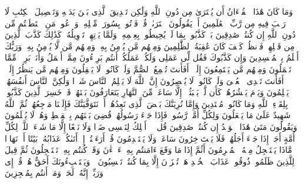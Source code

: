 \startbuffer[\q:10:37]
وَمَا كَانَ هَٰذَا ٱلۡقُرۡءَانُ أَن یُفۡتَرَىٰ مِن دُونِ ٱللَّهِ وَلَٰكِن تَصۡدِیقَ ٱلَّذِی بَیۡنَ یَدَیۡهِ وَتَفۡصِیلَ ٱلۡكِتَٰبِ لَا رَیۡبَ فِیهِ مِن رَّبِّ ٱلۡعَٰلَمِینَ%
\stopbuffer%
\startbuffer[\q:10:38]
أَمۡ یَقُولُونَ ٱفۡتَرَىٰهُۖ قُلۡ فَأۡتُوا۟ بِسُورَةࣲ مِّثۡلِهِۦ وَٱدۡعُوا۟ مَنِ ٱسۡتَطَعۡتُم مِّن دُونِ ٱللَّهِ إِن كُنتُمۡ صَٰدِقِینَ%
\stopbuffer%
\startbuffer[\q:10:39]
بَلۡ كَذَّبُوا۟ بِمَا لَمۡ یُحِیطُوا۟ بِعِلۡمِهِۦ وَلَمَّا یَأۡتِهِمۡ تَأۡوِیلُهُۥۚ كَذَٰلِكَ كَذَّبَ ٱلَّذِینَ مِن قَبۡلِهِمۡۖ فَٱنظُرۡ كَیۡفَ كَانَ عَٰقِبَةُ ٱلظَّٰلِمِینَ%
\stopbuffer%
\startbuffer[\q:10:40]
وَمِنۡهُم مَّن یُؤۡمِنُ بِهِۦ وَمِنۡهُم مَّن لَّا یُؤۡمِنُ بِهِۦۚ وَرَبُّكَ أَعۡلَمُ بِٱلۡمُفۡسِدِینَ%
\stopbuffer%
\startbuffer[\q:10:41]
وَإِن كَذَّبُوكَ فَقُل لِّی عَمَلِی وَلَكُمۡ عَمَلُكُمۡۖ أَنتُم بَرِیۤءُونَ مِمَّاۤ أَعۡمَلُ وَأَنَا۠ بَرِیۤءࣱ مِّمَّا تَعۡمَلُونَ%
\stopbuffer%
\startbuffer[\q:10:42]
وَمِنۡهُم مَّن یَسۡتَمِعُونَ إِلَیۡكَۚ أَفَأَنتَ تُسۡمِعُ ٱلصُّمَّ وَلَوۡ كَانُوا۟ لَا یَعۡقِلُونَ%
\stopbuffer%
\startbuffer[\q:10:43]
وَمِنۡهُم مَّن یَنظُرُ إِلَیۡكَۚ أَفَأَنتَ تَهۡدِی ٱلۡعُمۡیَ وَلَوۡ كَانُوا۟ لَا یُبۡصِرُونَ%
\stopbuffer%
\startbuffer[\q:10:44]
إِنَّ ٱللَّهَ لَا یَظۡلِمُ ٱلنَّاسَ شَیۡءࣰا وَلَٰكِنَّ ٱلنَّاسَ أَنفُسَهُمۡ یَظۡلِمُونَ%
\stopbuffer%
\startbuffer[\q:10:45]
وَیَوۡمَ یَحۡشُرُهُمۡ كَأَن لَّمۡ یَلۡبَثُوۤا۟ إِلَّا سَاعَةࣰ مِّنَ ٱلنَّهَارِ یَتَعَارَفُونَ بَیۡنَهُمۡۚ قَدۡ خَسِرَ ٱلَّذِینَ كَذَّبُوا۟ بِلِقَاۤءِ ٱللَّهِ وَمَا كَانُوا۟ مُهۡتَدِینَ%
\stopbuffer%
\startbuffer[\q:10:46]
وَإِمَّا نُرِیَنَّكَ بَعۡضَ ٱلَّذِی نَعِدُهُمۡ أَوۡ نَتَوَفَّیَنَّكَ فَإِلَیۡنَا مَرۡجِعُهُمۡ ثُمَّ ٱللَّهُ شَهِیدٌ عَلَىٰ مَا یَفۡعَلُونَ%
\stopbuffer%
\startbuffer[\q:10:47]
وَلِكُلِّ أُمَّةࣲ رَّسُولࣱۖ فَإِذَا جَاۤءَ رَسُولُهُمۡ قُضِیَ بَیۡنَهُم بِٱلۡقِسۡطِ وَهُمۡ لَا یُظۡلَمُونَ%
\stopbuffer%
\startbuffer[\q:10:48]
وَیَقُولُونَ مَتَىٰ هَٰذَا ٱلۡوَعۡدُ إِن كُنتُمۡ صَٰدِقِینَ%
\stopbuffer%
\startbuffer[\q:10:49]
قُل لَّاۤ أَمۡلِكُ لِنَفۡسِی ضَرࣰّا وَلَا نَفۡعًا إِلَّا مَا شَاۤءَ ٱللَّهُۗ لِكُلِّ أُمَّةٍ أَجَلٌۚ إِذَا جَاۤءَ أَجَلُهُمۡ فَلَا یَسۡتَءۡخِرُونَ سَاعَةࣰ وَلَا یَسۡتَقۡدِمُونَ%
\stopbuffer%
\startbuffer[\q:10:50]
قُلۡ أَرَءَیۡتُمۡ إِنۡ أَتَىٰكُمۡ عَذَابُهُۥ بَیَٰتًا أَوۡ نَهَارࣰا مَّاذَا یَسۡتَعۡجِلُ مِنۡهُ ٱلۡمُجۡرِمُونَ%
\stopbuffer%
\startbuffer[\q:10:51]
أَثُمَّ إِذَا مَا وَقَعَ ءَامَنتُم بِهِۦۤۚ ءَاۤلۡءَٰنَ وَقَدۡ كُنتُم بِهِۦ تَسۡتَعۡجِلُونَ%
\stopbuffer%
\startbuffer[\q:10:52]
ثُمَّ قِیلَ لِلَّذِینَ ظَلَمُوا۟ ذُوقُوا۟ عَذَابَ ٱلۡخُلۡدِ هَلۡ تُجۡزَوۡنَ إِلَّا بِمَا كُنتُمۡ تَكۡسِبُونَ%
\stopbuffer%
\startbuffer[\q:10:53]
۞ وَیَسۡتَنۢبِءُونَكَ أَحَقٌّ هُوَۖ قُلۡ إِی وَرَبِّیۤ إِنَّهُۥ لَحَقࣱّۖ وَمَاۤ أَنتُم بِمُعۡجِزِینَ%
